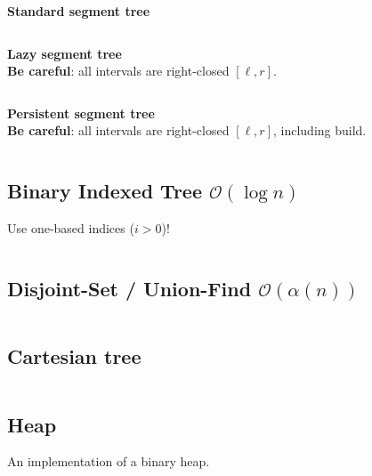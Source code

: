 \documentclass[8pt,a4paper,landscape,oneside]{amsart}
\newcommand{\mintedstyle}[2]{\inputminted[fontsize=\normalsize,baselinestretch=.9,breaklines,tabsize=2]{#1}{code/#2}}
\newcommand{\code}[1]{\mintedstyle{cpp}{#1}}
\begin{document}
\begin{multicols*}{3}
\textbf{Standard segment tree}
\code{datastructures/segment_tree.cpp}

\textbf{Lazy segment tree}\\
\textbf{Be careful}: all intervals are right-closed $[\ell,r]$.
\code{datastructures/lazy_segment_tree.cpp}

\textbf{Persistent segment tree} \\
\textbf{Be careful}: all intervals are right-closed $[\ell,r]$, including build.
\code{datastructures/persistent_segment_tree.cpp}

\subsection{Binary Indexed Tree $\mathcal{O}(\log n)$}

Use one-based indices ($i > 0$)!
\code{datastructures/bit.cpp}

\subsection{Disjoint-Set / Union-Find $\mathcal{O}(\alpha (n))$}
\code{datastructures/dsu.cpp}


\subsection{Cartesian tree}
\code{datastructures/cartesian_tree.cpp}

\subsection{Heap}
An implementation of a binary heap.
\code{datastructures/heap.cpp}


\end{multicols*}
\end{document}
